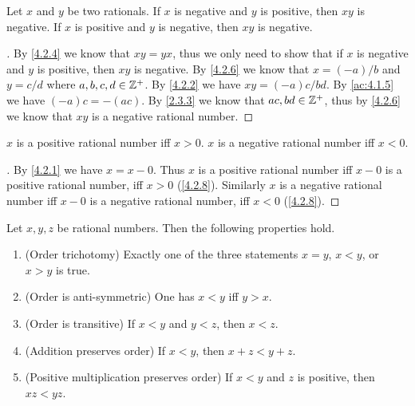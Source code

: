 \begin{ac}\label{ac:4.2.8}
  Let \(x\) and \(y\) be two rationals.
  If \(x\) is negative and \(y\) is positive, then \(xy\) is negative.
  If \(x\) is positive and \(y\) is negative, then \(xy\) is negative.
\end{ac}

\begin{proof}[]
  By \cref{4.2.4} we know that \(xy = yx\), thus we only need to show that if \(x\) is negative and \(y\) is positive, then \(xy\) is negative.
  By \cref{4.2.6} we know that \(x = (-a) / b\) and \(y = c / d\) where \(a, b, c, d \in \mathbb{Z}^+\).
  By \cref{4.2.2} we have \(xy = (-a)c / bd\).
  By \cref{ac:4.1.5} we have \((-a)c = -(ac)\).
  By \cref{2.3.3} we know that \(ac, bd \in \mathbb{Z}^+\), thus by \cref{4.2.6} we know that \(xy\) is a negative rational number.
\end{proof}

\begin{ac}\label{ac:4.2.9}
  \(x\) is a positive rational number iff \(x > 0\).
  \(x\) is a negative rational number iff \(x < 0\).
\end{ac}

\begin{proof}[]
  By \cref{4.2.1} we have \(x = x - 0\).
  Thus \(x\) is a positive rational number iff \(x - 0\) is a positive rational number, iff \(x > 0\) (\cref{4.2.8}).
  Similarly \(x\) is a negative rational number iff \(x - 0\) is a negative rational number, iff \(x < 0\) (\cref{4.2.8}).
\end{proof}

\begin{prop}\label{4.2.9}
  Let \(x, y, z\) be rational numbers.
  Then the following properties hold.
  \begin{enumerate}
    \item (Order trichotomy)
          Exactly one of the three statements \(x = y\), \(x < y\), or \(x > y\) is true.
    \item (Order is anti-symmetric)
          One has \(x < y\) iff \(y > x\).
    \item (Order is transitive)
          If \(x < y\) and \(y < z\), then \(x < z\).
    \item (Addition preserves order)
          If \(x < y\), then \(x + z < y + z\).
    \item (Positive multiplication preserves order)
          If \(x < y\) and \(z\) is positive, then \(xz < yz\).
  \end{enumerate}
\end{prop}

